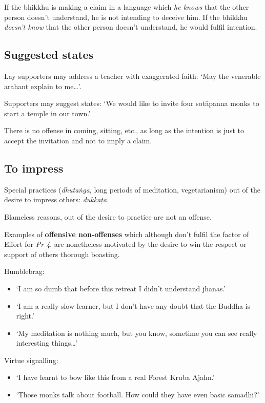 If the bhikkhu is making a claim in a language which \emph{he knows}
that the other person doesn't understand, he is not intending to deceive
him. If the bhikkhu \emph{doesn't know} that the other person doesn't
understand, he would fulfil intention.

\subsection{Suggested states}

Lay supporters may address a teacher with exaggerated faith: `May the
venerable arahant explain to me\ldots{}'.

Supporters may suggest states: `We would like to invite four sotāpanna
monks to start a temple in our town.'

There is no offense in coming, sitting, etc., as long as the intention
is just to accept the invitation and not to imply a claim.

\clearpage

\subsection{To impress}

Special practices (\emph{dhutaṅga}, long periods of meditation,
vegetarianism) out of the desire to impress others: \emph{dukkaṭa}.

Blameless reasons, out of the desire to practice are not an offense.

Examples of \textbf{offensive non-offenses} which although don't fulfil
the factor of Effort for \emph{Pr 4}, are nonetheless motivated by the
desire to win the respect or support of others thorough boasting.

Humblebrag:

\begin{itemize}
\tightlist
\item
  `I am so dumb that before this retreat I didn't understand jhānas.'
\item
  `I am a really slow learner, but I don't have any doubt that the
  Buddha is right.'
\item
  `My meditation is nothing much, but you know, sometime you can see
  really interesting things\ldots{}'
\end{itemize}

Virtue signalling:

\begin{itemize}
\tightlist
\item
  `I have learnt to bow like this from a real Forest Kruba Ajahn.'
\item
  `Those monks talk about football. How could they have even basic
  samādhi?'
\end{itemize}

